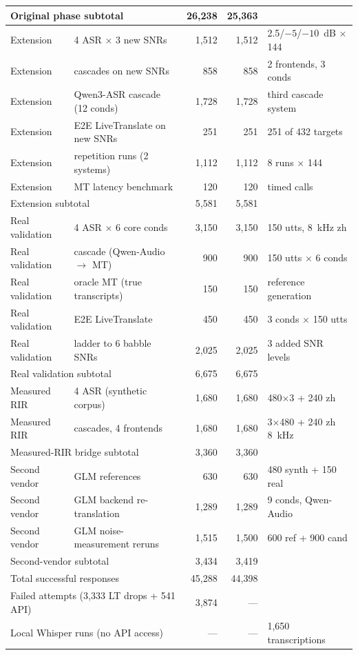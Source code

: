 \begin{table}[t]
\begin{tabular}{llrrl}
\midrule
\multicolumn{2}{l}{Original phase subtotal} & 26{,}238 & 25{,}363 & \\
\midrule
Extension & 4 ASR $\times$ 3 new SNRs & 1{,}512 & 1{,}512 & 2.5/$-5$/$-10$~dB $\times$ 144 \\
Extension & cascades on new SNRs & 858 & 858 & 2 frontends, 3 conds \\
Extension & Qwen3-ASR cascade (12 conds) & 1{,}728 & 1{,}728 & third cascade system \\
Extension & E2E LiveTranslate on new SNRs & 251 & 251 & 251 of 432 targets \\
Extension & repetition runs (2 systems) & 1{,}112 & 1{,}112 & 8 runs $\times$ 144 \\
Extension & MT latency benchmark & 120 & 120 & timed calls \\
\midrule
\multicolumn{2}{l}{Extension subtotal} & 5{,}581 & 5{,}581 & \\
\midrule
Real validation & 4 ASR $\times$ 6 core conds & 3{,}150 & 3{,}150 & 150 utts, 8~kHz zh \\
Real validation & cascade (Qwen-Audio $\to$ MT) & 900 & 900 & 150 utts $\times$ 6 conds \\
Real validation & oracle MT (true transcripts) & 150 & 150 & reference generation \\
Real validation & E2E LiveTranslate & 450 & 450 & 3 conds $\times$ 150 utts \\
Real validation & ladder to 6 babble SNRs & 2{,}025 & 2{,}025 & 3 added SNR levels \\
\midrule
\multicolumn{2}{l}{Real validation subtotal} & 6{,}675 & 6{,}675 & \\
\midrule
Measured RIR & 4 ASR (synthetic corpus) & 1{,}680 & 1{,}680 & 480$\times$3 + 240 zh \\
Measured RIR & cascades, 4 frontends & 1{,}680 & 1{,}680 & 3$\times$480 + 240 zh 8~kHz \\
\midrule
\multicolumn{2}{l}{Measured-RIR bridge subtotal} & 3{,}360 & 3{,}360 & \\
\midrule
Second vendor & GLM references & 630 & 630 & 480 synth + 150 real \\
Second vendor & GLM backend re-translation & 1{,}289 & 1{,}289 & 9 conds, Qwen-Audio \\
Second vendor & GLM noise-measurement reruns & 1{,}515 & 1{,}500 & 600 ref + 900 cand \\
\midrule
\multicolumn{2}{l}{Second-vendor subtotal} & 3{,}434 & 3{,}419 & \\
\midrule
\multicolumn{2}{l}{Total successful responses} & 45{,}288 & 44{,}398 & \\
\multicolumn{2}{l}{Failed attempts (3{,}333 LT drops + 541 API)} & 3{,}874 & --- & \\
\multicolumn{2}{l}{Local Whisper runs (no API access)} & --- & --- & 1{,}650 transcriptions \\
\bottomrule
\end{tabular}
\end{table}

